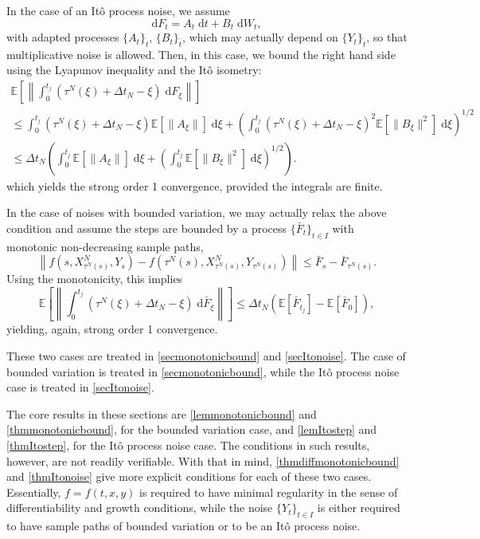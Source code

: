 \documentclass[reqno,12pt]{amsart}
\theoremstyle{plain} %
\theoremstyle{definition} %
\begin{document}
In the case of an It\^o process noise, we assume
\[
    \mathrm{d}F_t = A_t\;\mathrm{d}t + B_t\;\mathrm{d}W_t,
\]
with adapted processes $\{A_t\}_t$, $\{B_t\}_t$, which may actually depend on $\{Y_t\}_t$, so that multiplicative noise is allowed. Then, in this case, we bound the right hand side using the Lyapunov inequality and the It\^o isometry:
\begin{multline*}
    \mathbb{E}\left[\left\| \int_0^{t_j} (\tau^N(\xi) + \Delta t_N - \xi) \;\mathrm{d} F_\xi \right\|\right] \\
    \leq \int_0^{t_j} (\tau^N(\xi) + \Delta t_N - \xi) \mathbb{E}[\|A_\xi\|] \;\mathrm{d}\xi + \left( \int_0^{t_j} (\tau^N(\xi) + \Delta t_N - \xi)^2 \mathbb{E}[\|B_\xi\|^2]\;\mathrm{d} \xi\right)^{1/2} \\ 
    \leq \Delta t_N\left(\int_0^{t_j} \mathbb{E}[\|A_\xi\|]\;\mathrm{d} \xi + \left( \int_0^{t_j} \mathbb{E}[\|B_\xi\|^2] \;\mathrm{d}\xi \right)^{1/2} \right).
\end{multline*}
which yields the strong order 1 convergence, provided the integrals are finite.

In the case of noises with bounded variation, we may actually relax the above condition and assume the steps are bounded by a process $\{\bar F_t\}_{t\in I}$ with monotonic non-decreasing sample paths,
\[
    \left\|f(s, X_{\tau^N(s)}^N, Y_s) - f(\tau^N(s), X_{\tau^N(s)}^N, Y_{\tau^N(s)})\right\| \leq \bar F_s - \bar F_{\tau^N(s)}.
\]
Using the monotonicity, this implies
\[
    \mathbb{E}\left[\left\| \int_0^{t_j} (\tau^N(\xi) + \Delta t_N - \xi) \;\mathrm{d} \bar F_\xi \right\|\right] \leq \Delta t_N \left(\mathbb{E}[\bar F_{t_j}] - \mathbb{E}[\bar F_0]\right),
\]
yielding, again, strong order 1 convergence.

These two cases are treated in \cref{secmonotonicbound} and \cref{secItonoise}. The case of bounded variation is treated in \cref{secmonotonicbound}, while the It\^o process noise case is treated in \cref{secItonoise}.

The core results in these sections are \cref{lemmonotonicbound} and \cref{thmmonotonicbound}, for the bounded variation case, and \cref{lemItostep} and \cref{thmItostep}, for the It\^o process noise case. The conditions in such results, however, are not readily verifiable. With that in mind, \cref{thmdiffmonotonicbound} and \cref{thmItonoise} give more explicit conditions for each of these two cases. Essentially, $f=f(t, x, y)$ is required to have minimal regularity in the sense of differentiability and growth conditions, while the noise $\{Y_t\}_{t\in I}$ is either required to have sample paths of bounded variation or to be an It\^o process noise.
\end{document}
